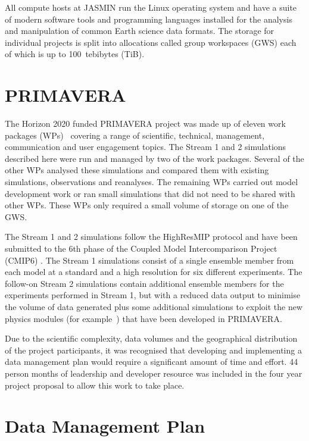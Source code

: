 \documentclass[gmd, manuscript]{copernicus}
\begin{document}
All compute hosts at JASMIN run the Linux operating system and have a suite of modern software tools and programming languages installed for the analysis and manipulation of common Earth science data formats. The storage for individual projects is split into allocations called group workspaces (GWS) each of which is up to 100~tebibytes (TiB).

\section{PRIMAVERA}

The Horizon 2020 funded PRIMAVERA project was made up of eleven work packages (WPs)~\citep{GrantAgree} covering a range of scientific, technical, management, communication and user engagement topics. The Stream 1 and 2 simulations described here were run and managed by two of the work packages. Several of the other WPs analysed these simulations and compared them with existing simulations, observations and reanalyses. The remaining WPs carried out model development work or ran small simulations that did not need to be shared with other WPs. These WPs only required a small volume of storage on one of the GWS.

The Stream 1 and 2 simulations follow the HighResMIP protocol and have been submitted to the 6th phase of the Coupled Model Intercomparison Project (CMIP6) \citep{Eyring2016}. The Stream 1 simulations consist of a single ensemble member from each model at a standard and a high resolution for six different experiments. The follow-on Stream 2 simulations contain additional ensemble members for the experiments performed in Stream 1, but with a reduced data output to minimise the volume of data generated plus some additional simulations to exploit the new physics modules (for example~\citep{Nurser2020}) that have been developed in PRIMAVERA.

Due to the scientific complexity, data volumes and the geographical distribution of the project participants, it was recognised that developing and implementing a data management plan would require a significant amount of time and effort. 44 person months of leadership and developer resource was included in the four year project proposal to allow this work to take place.


\section{Data Management Plan}
\end{document}
